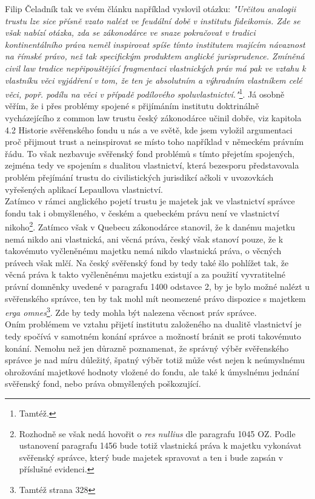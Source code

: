 \documentclass{article}
\begin{document}
Filip Čeladník tak ve svém článku například vyslovil otázku: \textit{"Určitou analogii trustu lze sice přísně vzato nalézt ve feudální době v institutu fideikomis. Zde se však nabízí otázka, zda se zákonodárce ve snaze pokračovat v tradici kontinentálního práva neměl inspirovat spíše tímto institutem majícím návaznost na římské právo, než tak specifickým produktem anglické jurisprudence. Zmíněná civil law tradice nepřipouštějící fragmentaci vlastnických práv má pak ve vztahu k vlastníku věci vyjádření v tom, že ten je absolutním a výhradním vlastníkem celé věci, popř. podílu na věci v případě podílového spoluvlastnictví."}\footnote{Tamtéž.}. Já osobně věřím, že i přes problémy spojené s přijímáním institutu doktrinálně vycházejícího z common law trustu český zákonodárce učinil dobře, viz kapitola 4.2 Historie svěřenského fondu u nás a ve světě, kde jsem vyložil argumentaci proč přijmout trust a neinspirovat se místo toho například v německém právním řádu. To však nezbavuje svěřenský fond problémů s tímto přejetím spojených, zejména tedy ve spojením s dualitou vlastnictví, která bezesporu představovala problém přejímání trustu do civilistických jurisdikcí ačkoli v uvozovkách vyřešených aplikací Lepaullova vlastnictví.\\

Zatímco v rámci anglického pojetí trustu je majetek jak ve vlastnictví správce fondu tak i obmyšleného, v českém a quebeckém právu není ve vlastnictví nikoho\footnote{Rozhodně se však nedá hovořit o \textit{res nullius} dle paragrafu 1045 OZ. Podle ustanovení paragrafu 1456 bude totiž vlastnická práva k majetku vykonávat svěřenský správce, který bude majetek spravovat a ten i bude zapsán v příslušné evidenci.}. Zatímco však v Quebecu zákonodárce stanovil, že k danému majetku nemá nikdo ani vlastnická, ani věcná práva, český však stanoví pouze, že k takovémuto vyčleněnému majetku nemá nikdo vlastnická práva, o věcných právech však mlčí. Na český svěřenský fond by tedy také šlo pohlížet tak, že věcná práva k takto vyčleněnému majetku existují a za použití vyvratitelné právní domněnky uvedené v paragrafu 1400 odstavce 2, by je bylo možné nalézt u svěřenského správce, ten by tak mohl mít neomezené právo dispozice s majetkem \textit{erga omnes}\footnote{Tamtéž strana 328}. Zde by tedy mohla být nalezena věcnost práv správce.\\

Oním problémem ve vztahu přijetí institutu založeného na dualitě vlastnictví je tedy spočívá v samotném konání správce a možností bránit se proti takovémuto konání. Nemohu než jen důrazně poznamenat, že správný výběr svěřenského správce je nad míru důležitý, špatný výběr totiž může vést nejen k neúmyslnému ohrožování majetkové hodnoty vložené do fondu, ale také k úmyslnému jednání svěřenský fond, nebo práva obmyšlených poškozující.\\
\end{document}
